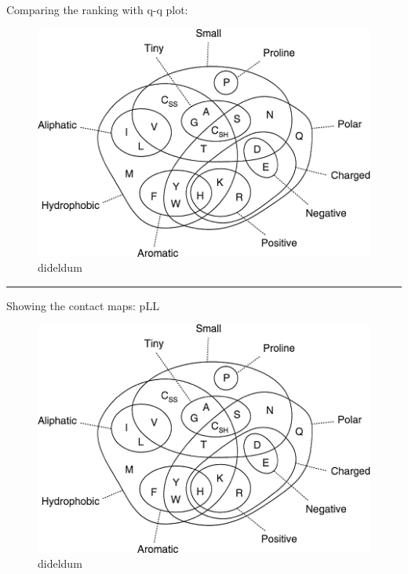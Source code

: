 \documentclass[11pt,a4paper,twoside]{book}
\theoremstyle{definition}
\theoremstyle{definition}
\theoremstyle{remark}
\begin{document}
Comparing the ranking with q-q plot:

\begin{figure}

{\centering \includegraphics[width=1\linewidth]{img/aa_venn_diagram} 

}

\caption{dideldum}\label{fig:comparing-cd-pll-ranking-qq}
\end{figure}

\begin{center}\rule{0.5\linewidth}{\linethickness}\end{center}

Showing the contact maps: pLL

\begin{figure}

{\centering \includegraphics[width=1\linewidth]{img/aa_venn_diagram} 

}

\caption{dideldum}\label{fig:contact-map-1c75a00-pll}
\end{figure}
\end{document}
